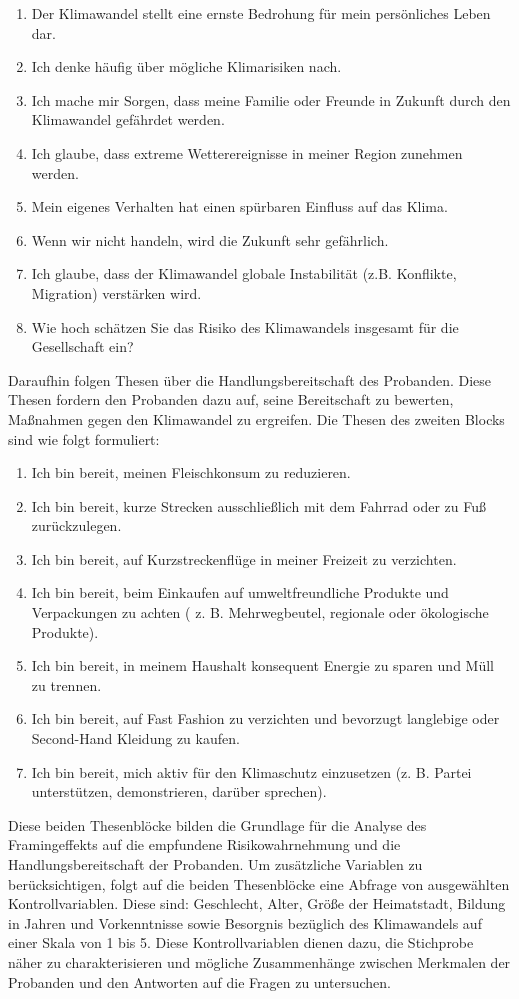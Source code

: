\documentclass[
	12pt, %
	a4paper,
	listof=totoc, %
  bibliography=totoc, %
	numbers=noenddot, %
	german, %
	headsepline, %
	oneside %
	]{scrbook} %
\begin{document}
\begin{enumerate}
  \item Der Klimawandel stellt eine ernste Bedrohung für mein persönliches Leben dar.
  \item Ich denke häufig über mögliche Klimarisiken nach.
  \item Ich mache mir Sorgen, dass meine Familie oder Freunde in Zukunft durch den Klimawandel gefährdet werden.
  \item Ich glaube, dass extreme Wetterereignisse in meiner Region zunehmen werden.
  \item Mein eigenes Verhalten hat einen spürbaren Einfluss auf das Klima.
  \item Wenn wir nicht handeln, wird die Zukunft sehr gefährlich.
  \item Ich glaube, dass der Klimawandel globale Instabilität (z.B. Konflikte, Migration) verstärken wird.
  \item Wie hoch schätzen Sie das Risiko des Klimawandels insgesamt für die Gesellschaft ein?
\end{enumerate}

Daraufhin folgen Thesen über die Handlungsbereitschaft des Probanden. Diese Thesen fordern den Probanden dazu auf, seine Bereitschaft zu bewerten, Maßnahmen gegen den Klimawandel zu ergreifen. Die Thesen des zweiten Blocks sind wie folgt formuliert:
\begin{enumerate}
  \item Ich bin bereit, meinen Fleischkonsum zu reduzieren.
  \item Ich bin bereit, kurze Strecken ausschließlich mit dem Fahrrad oder zu Fuß zurückzulegen.
  \item Ich bin bereit, auf Kurzstreckenflüge in meiner Freizeit zu verzichten.
  \item Ich bin bereit, beim Einkaufen auf umweltfreundliche Produkte und Verpackungen zu achten ( z. B. Mehrwegbeutel, regionale oder ökologische Produkte).
  \item Ich bin bereit, in meinem Haushalt konsequent Energie zu sparen und Müll zu trennen.
  \item Ich bin bereit, auf Fast Fashion zu verzichten und bevorzugt langlebige oder Second-Hand Kleidung zu kaufen.
  \item Ich bin bereit, mich aktiv für den Klimaschutz einzusetzen (z. B. Partei unterstützen, demonstrieren, darüber sprechen).
\end{enumerate}

Diese beiden Thesenblöcke bilden die Grundlage für die Analyse des Framingeffekts auf die empfundene Risikowahrnehmung und die Handlungsbereitschaft der Probanden. Um zusätzliche Variablen zu berücksichtigen, folgt auf die beiden Thesenblöcke eine Abfrage von ausgewählten Kontrollvariablen. Diese sind: Geschlecht, Alter, Größe der Heimatstadt, Bildung in Jahren und Vorkenntnisse sowie Besorgnis bezüglich des Klimawandels auf einer Skala von 1 bis 5.
Diese Kontrollvariablen dienen dazu, die Stichprobe näher zu charakterisieren und mögliche Zusammenhänge zwischen Merkmalen der Probanden und den Antworten auf die Fragen zu untersuchen.
\end{document}
